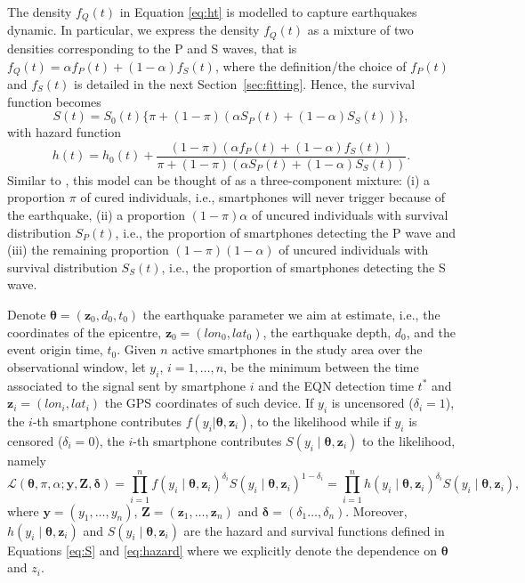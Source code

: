 \documentclass[final]{statsoc}
\newcommand{\bs}{\boldsymbol}
\begin{document}
The density $f_{Q}(t)$ in Equation \eqref{eq:ht} is modelled to capture earthquakes dynamic. In particular, we express the density $f_{Q}(t)$ as a mixture of two densities corresponding to the P and S waves, that is $f_{Q}(t) = \alpha f_{P}(t) + (1-\alpha) f_{S}(t)$, where the definition/the choice of $f_P(t)$ and $f_S(t)$ is detailed in the next Section~\ref{sec:fitting}. Hence, the survival function becomes
%
\begin{equation}\label{eq:S}
    S(t) = S_{0}(t)\{\pi + (1-\pi)(\alpha S_{P}(t) + (1-\alpha) S_{S}(t))\},
\end{equation}
%
with hazard function
%
\begin{equation}
    h(t) = h_{0}(t) + \frac{(1-\pi)(\alpha f_{P}(t) + (1-\alpha) f_{S}(t))}{\pi + (1-\pi)(\alpha S_{P}(t) + (1-\alpha) S_{S}(t))}.
    \label{eq:hazard}
\end{equation}
%
Similar to \citet{lambert2010estimating},  this model can be thought of as a three-component mixture: (i) a proportion $\pi$ of cured individuals, i.e., smartphones will never trigger because of the earthquake, (ii) a proportion $(1 - \pi)\alpha$ of uncured individuals with survival distribution $S_{P}(t)$, i.e., the proportion of smartphones detecting the P wave and (iii) the remaining proportion $(1-\pi)(1-\alpha)$ of uncured individuals with survival distribution $S_{S}(t)$, i.e., the proportion of smartphones detecting the S wave.

Denote $\bs{\theta} = (\mathbf{z}_{0},d_{0},t_{0})$ the earthquake parameter we aim at estimate, i.e., the coordinates of the epicentre, $\mathbf{z}_{0} = (lon_{0},lat_{0})$, the earthquake depth, $d_{0}$, and the event origin time, $t_{0}$. Given $n$ active smartphones in the study area over the observational window, let  $y_{i}$, $i=1,\dots,n$, be the minimum between the time associated to the signal sent by smartphone $i$ and the EQN detection time $t^\ast$ and $\mathbf{z}_{i}=(lon_{i},lat_{i})$ the GPS coordinates of such device. If $y_{i}$ is uncensored ($\delta_{i} = 1$), the $i$-th smartphone contributes $f(y_{i}| \bs{\theta}, \mathbf{z}_i)$, to the likelihood while if $y_{i}$ is censored ($\delta_{i}  = 0$), the $i$-th smartphone contributes $S(y_{i}\mid \bs{\theta}, \mathbf{z}_i)$ to the likelihood, namely
%
\begin{equation}\label{eq:likelihood}
    \mathcal{L}(\bs{\theta},\pi,\alpha;\mathbf{y}, \mathbf{Z}, \bs{\delta}) = \prod_{i=1}^n f(y_{i}\mid \bs{\theta}, \mathbf{z}_i)^{\delta_{i}} S(y_{i}\mid \bs{\theta}, \mathbf{z}_i)^{1-\delta_{i}} = \prod_{i=1}^n h(y_{i}\mid \bs{\theta}, \mathbf{z}_i)^{\delta_{i}} S(y_{i}\mid \bs{\theta}, \mathbf{z}_i),
\end{equation}
%
where $\mathbf{y}=(y_1, \dots, y_n)$, $\mathbf{Z}=(\mathbf{z}_1, \dots, \mathbf{z}_n)$ and $\boldsymbol{\delta}=(\delta_1\dots, \delta_n)$.
Moreover, $h(y_{i}\mid \bs{\theta}, \mathbf{z}_i)$ and $S(y_{i}\mid \bs{\theta}, \mathbf{z}_i)$ are the hazard and survival functions defined in Equations \eqref{eq:S} and \eqref{eq:hazard} where we  explicitly denote the dependence on $\bs{\theta}$ and $z_i$.
\end{document}
